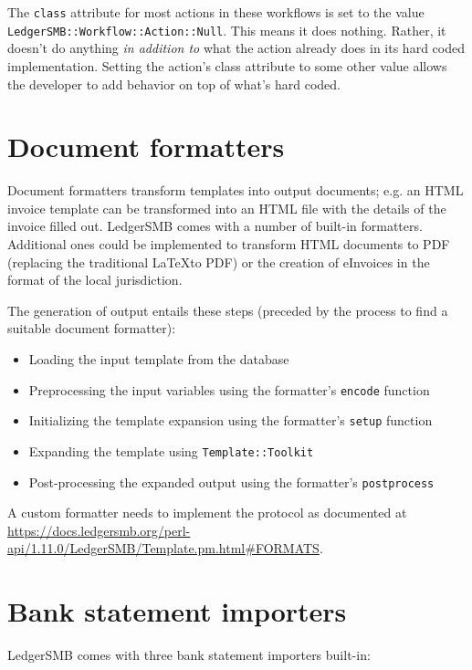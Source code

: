 The \texttt{class} attribute for most actions in these workflows is set to the value
\texttt{LedgerSMB::Workflow::Action::Null}.  This means it does nothing.  Rather, it
doesn't do anything \textit{in addition to} what the action already does in its hard
coded implementation.  Setting the action's class attribute to some other value allows
the developer to add behavior on top of what's hard coded.

\section{Document formatters}
\label{sec-customization-document-formatters}

Document formatters transform templates into output documents; e.g. an HTML invoice
template can be transformed into an HTML file with the details of the invoice filled
out.  LedgerSMB comes with a number of built-in formatters.  Additional ones could be
implemented to transform HTML documents to PDF (replacing the traditional \LaTeX to PDF)
or the creation of eInvoices in the format of the local jurisdiction.

The generation of output entails these steps (preceded by the process to find a
suitable document formatter):

\begin{itemize}
	\item Loading the input template from the database
	\item Preprocessing the input variables using the formatter's \texttt{encode}
		function
	\item Initializing the template expansion using the formatter's \texttt{setup} function
	\item Expanding the template using \texttt{Template::Toolkit}
	\item Post-processing the expanded output using the formatter's \texttt{postprocess}
\end{itemize}

A custom formatter needs to implement the protocol as documented at \url{https://docs.ledgersmb.org/perl-api/1.11.0/LedgerSMB/Template.pm.html#FORMATS}.

\section{Bank statement importers}
\label{sec-customization-bank-importers}

LedgerSMB comes with three bank statement importers built-in:

